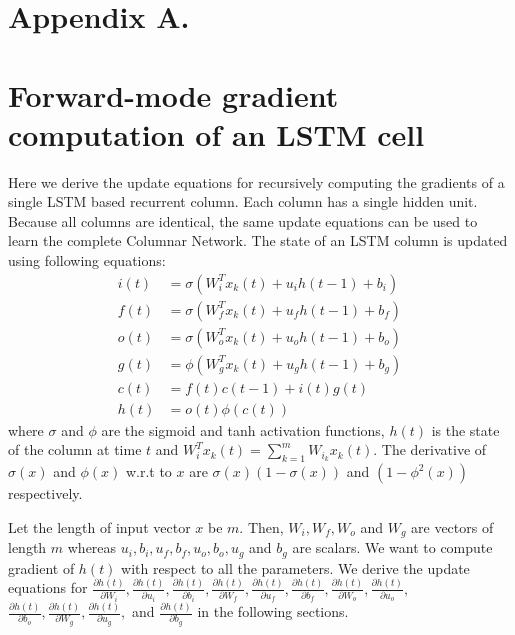 \documentclass[twoside,11pt]{article}
\begin{document}

\newpage

\appendix
\section*{Appendix A.}

\section{Forward-mode gradient computation of an LSTM cell }

Here we derive the update equations for recursively computing the gradients of a single LSTM based recurrent column. Each column has a single hidden unit. Because all columns are identical, the same update equations can be used to learn the complete Columnar Network.  The state of an LSTM column is updated using following equations: 
\begin{align}
i(t) &= \sigma( W_{i}^T x_k(t) + u_{i} h(t-1) + b_i) \label{i} \\
f(t) &= \sigma( W_{f}^T x_k(t) + u_{f} h(t-1) + b_f) \label{f} \\
o(t) &= \sigma( W_{o}^T x_k(t) + u_{o} h(t-1) + b_o) \label{o} \\
g(t) &= \phi( W_{g}^T x_k(t) + u_{g} h(t-1) + b_g) \label{g} \\
c(t) &= f(t)  c(t-1) + i(t) g(t) \label{c} \\
h(t) &= o(t)  \phi(c(t)) \label{state_update}
\end{align}
where $\sigma$ and $\phi$ are the sigmoid and tanh activation functions, $h(t)$ is the state of the column at time $t$ and $ W_{i}^T x_k(t) = \sum_{k=1}^m W_{i_k} x_k(t)$. The derivative of $\sigma(x)$ and $\phi(x)$ w.r.t to $x$ are $\sigma(x)(1-\sigma(x))$ and $(1-\phi^2(x))$ respectively.

Let the length of input vector $x$ be $m$. Then, $W_{i}, W_{f}, W_{o}$ and $W_{g}$ are vectors of length $m$ whereas $u_i, b_i, u_f, b_f, u_o, b_o, u_g$ and $b_g$ are scalars. We want to compute gradient of $h(t)$ with respect to all the parameters. We derive the update equations for $\frac{\partial h(t)}{\partial W_{i}} ,\frac{\partial h(t)}{\partial u_{i}}, $$\frac{\partial h(t)}{\partial b_{i}}, \frac{\partial h(t)}{\partial W_{f}} $$,\frac{\partial h(t)}{\partial u_{f}}, \frac{\partial h(t)}{\partial b_{f}}, $$\frac{\partial h(t)}{\partial W_{o}} ,\frac{\partial h(t)}{\partial u_{o}},$$ \frac{\partial h(t)}{\partial b_{o}}, \frac{\partial h(t)}{\partial W_{g}} ,\frac{\partial h(t)}{\partial u_{g}},$ and $\frac{\partial h(t)}{\partial b_{g}}$ in the following sections. 
\end{document}
